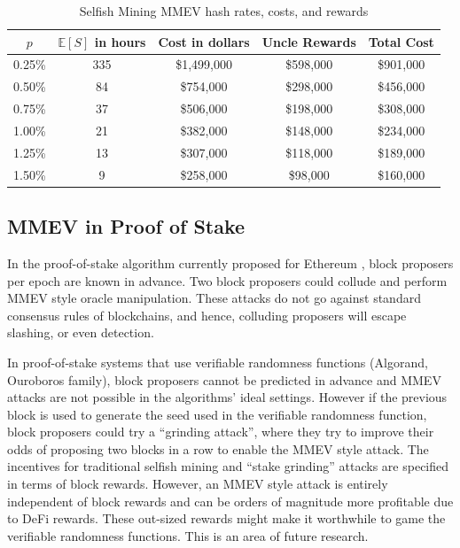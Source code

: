\begin{table}[h!]
\begin{center}
 \begin{tabular}{|c |c| c | c | c|} 
 \hline
 $p$ & $\mathbb{E}[S]$ in hours & Cost in dollars & Uncle Rewards & Total Cost\\ [0.5ex] 
 \hline
  0.25\% & 335& \$1,499,000 & \$598,000 &\$901,000\\
  \hline
  0.50\% & 84& \$754,000 & \$298,000 &\$456,000\\
  \hline
  0.75\% & 37& \$506,000 & \$198,000 &\$308,000\\
  \hline
  1.00\% & 21& \$382,000 & \$148,000 &\$234,000\\
  \hline
  1.25\% & 13& \$307,000 & \$118,000 &\$189,000\\
  \hline
  1.50\% & 9& \$258,000 & \$98,000 &\$160,000\\
  \hline
\end{tabular}
\end{center}
\caption{Selfish Mining MMEV hash rates, costs, and rewards}
\label{TableHittingTime}
\end{table}

\subsection{MMEV in Proof of Stake}
In the proof-of-stake algorithm currently proposed for Ethereum \cite{proof_of_stake}, block proposers per epoch are known in advance. Two block proposers could collude and perform MMEV style oracle manipulation. These attacks do not go against standard consensus rules of blockchains, and hence, colluding proposers will escape slashing, or even detection.

In proof-of-stake systems that use verifiable randomness functions (Algorand, Ouroboros family), block proposers cannot be predicted in advance and MMEV attacks are not possible in the algorithms' ideal settings. However if the previous block is used to generate the seed used in the verifiable randomness function, block proposers could try a ``grinding attack'', where they try to improve their odds of proposing two blocks in a row to enable the MMEV style attack. The incentives for traditional selfish mining and ``stake grinding'' attacks are specified in terms of block rewards. However, an MMEV style attack is entirely independent of block rewards and can be orders of magnitude more profitable due to DeFi rewards. These out-sized rewards might make it worthwhile to game the verifiable randomness functions. This is an area of future research.

